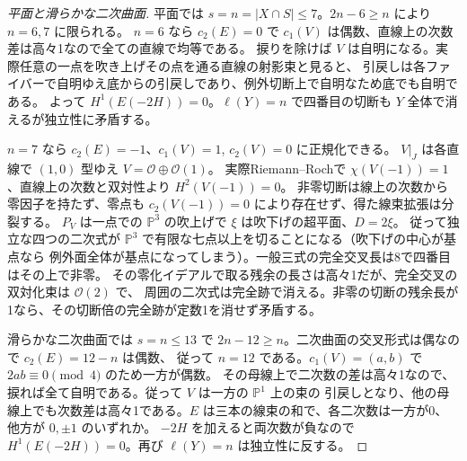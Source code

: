 \begin{proof}[平面と滑らかな二次曲面]
平面では $s=n=|X\cap S|\le7$。$2n-6\ge n$ により $n=6,7$ に限られる。
$n=6$ なら $c_2(E)=0$ で $c_1(V)$ は偶数、直線上の次数差は高々1なので全ての直線で均等である。
捩りを除けば $V$ は自明になる。実際任意の一点を吹き上げその点を通る直線の射影束と見ると、
引戻しは各ファイバーで自明ゆえ底からの引戻しであり、例外切断上で自明なため底でも自明である。
よって $H^1(E(-2H))=0$。$\ell(Y)=n$ で四番目の切断も $Y$ 全体で消えるが独立性に矛盾する。

$n=7$ なら $c_2(E)=-1$、$c_1(V)=1$, $c_2(V)=0$ に正規化できる。
$V|_J$ は各直線で $(1,0)$ 型ゆえ $V=\mathcal O\oplus\mathcal O(1)$。
実際Riemann--Rochで $\chi(V(-1))=1$、直線上の次数と双対性より $H^2(V(-1))=0$。
非零切断は線上の次数から零因子を持たず、零点も $c_2(V(-1))=0$ により存在せず、得た線束拡張は分裂する。
$P_V$ は一点での $\mathbb P^3$ の吹上げで $\xi$ は吹下げの超平面、$D=2\xi$。
従って独立な四つの二次式が $\mathbb P^3$ で有限な七点以上を切ることになる（吹下げの中心が基点なら
例外面全体が基点になってしまう）。一般三式の完全交叉長は8で四番目はその上で非零。
その零化イデアルで取る残余の長さは高々1だが、完全交叉の双対化束は $\mathcal O(2)$ で、
周囲の二次式は完全跡で消える。非零の切断の残余長が1なら、その切断倍の完全跡が定数1を消せず矛盾する。

滑らかな二次曲面では $s=n\le13$ で $2n-12\ge n$。二次曲面の交叉形式は偶なので $c_2(E)=12-n$ は偶数、
従って $n=12$ である。$c_1(V)=(a,b)$ で $2ab\equiv0\pmod4$ のため一方が偶数。
その母線上で二次数の差は高々1なので、捩れば全て自明である。従って $V$ は一方の $\mathbb P^1$ 上の束の
引戻しとなり、他の母線上でも次数差は高々1である。$E$ は三本の線束の和で、各二次数は一方が0、他方が $0,\pm1$ のいずれか。
$-2H$ を加えると両次数が負なので $H^1(E(-2H))=0$。再び $\ell(Y)=n$ は独立性に反する。
\end{proof}
